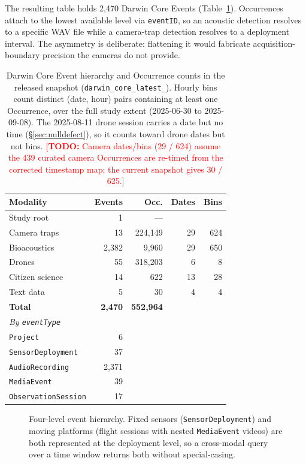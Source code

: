 \documentclass[sigconf]{acmart}
\newcommand{\TODO}[1]{\textcolor{red}{\footnotesize[\textbf{TODO:} #1]}}
\newcommand{\TODO}[1]{}
\begin{document}
The resulting table holds 2{,}470 Darwin Core Events
(Table~\ref{tab:schema}). Occurrences attach to the lowest available
level via \texttt{eventID}, so an acoustic detection resolves to a
specific WAV file while a camera-trap detection resolves to a deployment
interval. The asymmetry is deliberate: flattening it would fabricate
acquisition-boundary precision the cameras do not provide.

\begin{table}[t]
\caption{Darwin Core Event hierarchy and Occurrence counts in the
released snapshot (\texttt{darwin\_core\_\allowbreak latest\_}). Hourly bins count
distinct (date, hour) pairs containing at least one Occurrence, over
the full study extent (2025-06-30 to 2025-09-08). The 2025-08-11 drone
session carries a date but no time (\S\ref{sec:nulldefect}), so it
counts toward drone dates but not bins.
\TODO{Camera dates/bins (29 / 624) assume the 439 curated camera
Occurrences are re-timed from the corrected timestamp map; the current
snapshot gives 30 / 625.}}
\label{tab:schema}
\small
\begin{tabular}{lrrrr}
\toprule
\textbf{Modality} & \textbf{Events} & \textbf{Occ.} & \textbf{Dates} & \textbf{Bins} \\
\midrule
Study root & 1 & --- & & \\
Camera traps & 13 & 224{,}149 & 29 & 624 \\
Bioacoustics & 2{,}382 & 9{,}960 & 29 & 650 \\
Drones & 55 & 318{,}203 & 6 & 8 \\
Citizen science & 14 & 622 & 13 & 28 \\
Text data & 5 & 30 & 4 & 4 \\
\midrule
\textbf{Total} & \textbf{2{,}470} & \textbf{552{,}964} & & \\
\midrule
\multicolumn{5}{l}{\emph{By \texttt{eventType}}} \\
\texttt{Project} & 6 & & & \\
\texttt{SensorDeployment} & 37 & & & \\
\texttt{AudioRecording} & 2{,}371 & & & \\
\texttt{MediaEvent} & 39 & & & \\
\texttt{ObservationSession} & 17 & & & \\
\bottomrule
\end{tabular}
\end{table}

\begin{figure}[t]
    \centering
    \caption{Four-level event hierarchy. Fixed sensors
    (\texttt{SensorDeployment}) and moving platforms (flight sessions
    with nested \texttt{MediaEvent} videos) are both represented at the
    deployment level, so a cross-modal query over a time window returns
    both without special-casing.}
    \label{fig:hierarchy}
\end{figure}
\end{document}
